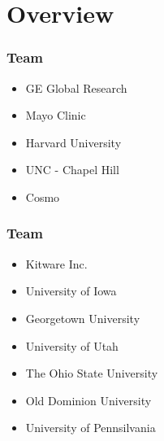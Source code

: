 \section{Overview}







\begin{frame}
\frametitle{Team}
\large
\begin{itemize}
\item GE Global Research
\pause
\item Mayo Clinic
\pause
\item Harvard University
\pause
\item UNC - Chapel Hill
\pause
\item Cosmo
\end{itemize}
\end{frame}

\begin{frame}
\frametitle{Team}
\large
\begin{itemize}
\item Kitware Inc.
\pause
\item University of Iowa
\pause
\item Georgetown University
\pause
\item University of Utah
\pause
\item The Ohio State University
\pause
\item Old Dominion University
\pause
\item University of Pennsilvania
\end{itemize}
\end{frame}







